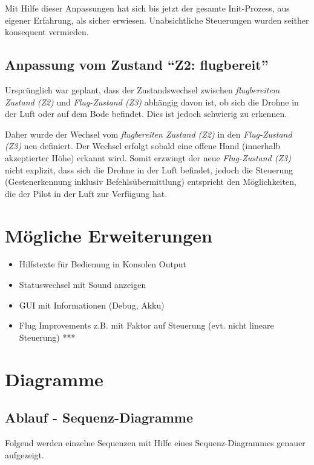 Mit Hilfe dieser Anpassungen hat sich bis jetzt der gesamte Init-Prozess, aus eigener Erfahrung, als sicher erwiesen.
Unabsichtliche Steuerungen wurden seither konsequent vermieden.

\subsection{Anpassung vom Zustand "`Z2: flugbereit"'}
Ursprünglich war geplant, dass der Zustandswechsel zwischen \textit{flugbereitem Zustand (Z2)} und \textit{Flug-Zustand (Z3)} abhängig davon ist, ob sich die Drohne in der Luft oder auf dem Bode befindet.
Dies ist jedoch schwierig zu erkennen.

Daher wurde der Wechsel vom \textit{flugbereiten Zustand (Z2)} in den \textit{Flug-Zustand (Z3)} neu definiert.
Der Wechsel erfolgt sobald eine offene Hand (innerhalb akzeptierter Höhe) erkannt wird.
Somit erzwingt der neue \textit{Flug-Zustand (Z3)} nicht explizit, dass sich die Drohne in der Luft befindet, jedoch die Steuerung (Gestenerkennung inklusiv Befehlsübermittlung) entspricht den Möglichkeiten, die der Pilot in der Luft zur Verfügung hat.



\section{Mögliche Erweiterungen}
\begin{itemize}
	\item Hilfstexte für Bedienung in Konsolen Output
	\item Statuswechsel mit Sound anzeigen
	\item GUI mit Informationen (Debug, Akku)
	\item Flug Improvements z.B. mit Faktor auf Steuerung (evt. nicht lineare Steuerung)
	*** 
\end{itemize}


\section{Diagramme}

\subsection{Ablauf - Sequenz-Diagramme}
Folgend werden einzelne Sequenzen mit Hilfe eines Sequenz-Diagrammes genauer aufgezeigt.

